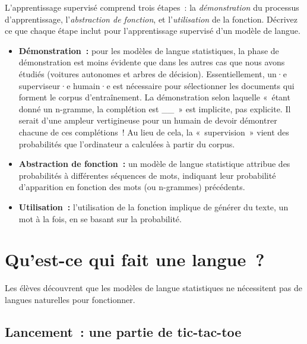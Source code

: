 \documentclass[12pt,a4paper]{article}
\begin{document}
\begin{thinkbox}
  L'apprentissage supervisé comprend trois étapes~: la \emph{démonstration} du processus d'apprentissage, l'\emph{abstraction de fonction}, et l'\emph{utilisation} de la fonction. Décrivez ce que chaque étape inclut pour l'apprentissage supervisé d'un modèle de langue.
  \begin{itemize}
    \item \textbf{Démonstration~:} pour les modèles de langue statistiques, la phase de démonstration est moins évidente que dans les autres cas que nous avons étudiés (voitures autonomes et arbres de décision). Essentiellement, un·e superviseur·e humain·e est nécessaire pour sélectionner les documents qui forment le corpus d'entraînement. La démonstration selon laquelle «~étant donné un n-gramme, la complétion est \_\_~» est implicite, pas explicite. Il serait d'une ampleur vertigineuse pour un humain de devoir démontrer chacune de ces complétions~! Au lieu de cela, la «~supervision~» vient des probabilités que l'ordinateur a calculées à partir du corpus.
    \item \textbf{Abstraction de fonction~:} un modèle de langue statistique attribue des probabilités à différentes séquences de mots, indiquant leur probabilité d'apparition en fonction des mots (ou n-grammes) précédents.
    \item \textbf{Utilisation~:} l'utilisation de la fonction implique de générer du texte, un mot à la fois, en se basant sur la probabilité.
  \end{itemize}
\end{thinkbox}

\newpage

\section{Qu'est-ce qui fait une langue~?}

\begin{overviewbox}
  Les élèves découvrent que les modèles de langue statistiques ne nécessitent pas de langues naturelles pour fonctionner.
\end{overviewbox}

\subsection{Lancement~: une partie de tic-tac-toe}
\end{document}
